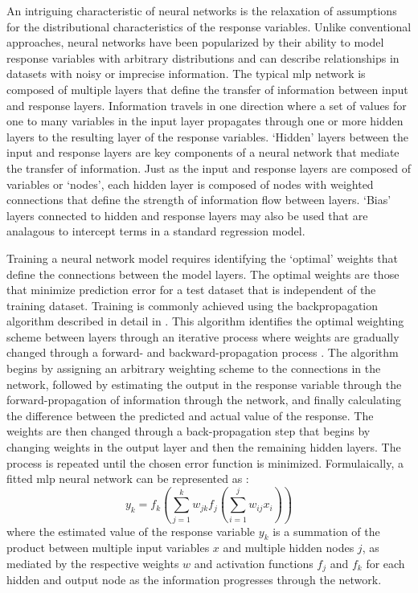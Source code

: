 \documentclass[article,shortnames]{jss}\usepackage[]{graphicx}\usepackage[]{color}
\begin{document}
An intriguing characteristic of neural networks is the relaxation of assumptions for the distributional characteristics of the response variables.  Unlike conventional approaches, neural networks have been popularized by their ability to model response variables with arbitrary distributions and can describe relationships in datasets with noisy or imprecise information.  The typical \ac{mlp} network is composed of multiple layers that define the transfer of information between input and response layers.  Information travels in one direction where a set of values for one to many variables in the input layer propagates through one or more hidden layers to the resulting layer of the response variables. `Hidden' layers between the input and response layers are key components of a neural network that mediate the transfer of information.  Just as the input and response layers are composed of variables or `nodes', each hidden layer is composed of nodes with weighted connections that define the strength of information flow between layers.  `Bias' layers connected to hidden and response layers may also be used that are analagous to intercept terms in a standard regression model.

Training a neural network model requires identifying the `optimal' weights that define the connections between the model layers.  The optimal weights are those that minimize prediction error for a test dataset that is independent of the training dataset.  Training is commonly achieved using the backpropagation algorithm described in detail in \citep{Rumelhart86}.  This algorithm identifies the optimal weighting scheme between layers through an iterative process where weights are gradually changed through a forward- and backward-propagation process \citep{Rumelhart86,Lek00}.  The algorithm begins by assigning an arbitrary weighting scheme to the connections in the network, followed by estimating the output in the response variable through the forward-propagation of information through the network, and finally calculating the difference between the predicted and actual value of the response.  The weights are then changed through a back-propagation step that begins by changing weights in the output layer and then the remaining hidden layers.  The process is repeated until the chosen error function is minimized.  Formulaically, a fitted \ac{mlp} neural network can be represented as \citep{Ripley96}:
\begin{equation}
y_k = f_k \left(\sum\limits_{j=1}^k w_{jk}f_j \left( \sum\limits_{i=1}^j w_{ij}x_i\right) \right)
\end{equation}
where the estimated value of the response variable $y_k$ is a summation of the product between multiple input variables $x$ and multiple hidden nodes $j$, as mediated by the respective weights $w$ and activation functions $f_j$ and $f_k$ for each hidden and output node as the information progresses through the network.
\end{document}
